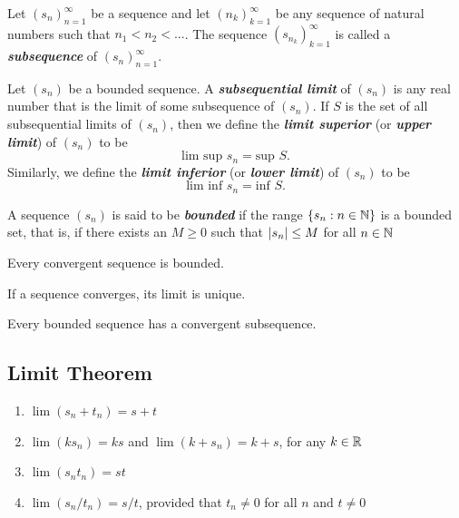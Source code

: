 \documentclass[12pt]{article}
\begin{document}
\begin{definition}[Subsequence]
Let $(s_n)_{n=1}^\infty$ be a sequence and let $(n_k)_{k=1}^{\infty}$ be any sequence
of natural numbers such that $n_1 < n_2 < ...$. The sequence
$(s_{n_k})_{k=1}^{\infty}$ is called a \textit{\textbf{subsequence}} of
$(s_n)_{n=1}^\infty$.
\end{definition}

\begin{definition}
  Let $(s_n)$ be a bounded sequence. A \textbf{\textit{subsequential limit}}
  of $(s_n)$ is any real number that is the limit of some subsequence of
  $(s_n)$. If $S$ is the set of all subsequential limits of $(s_n)$, then we
  define the \textbf{\textit{limit superior}} (or \textbf{\textit{upper
  limit}}) of $(s_n)$ to be $$\text{lim sup } s_n = \text{sup } S.$$
  Similarly, we define the \textit{\textbf{limit inferior}} (or
  \textit{\textbf{lower limit}}) of $(s_n)$ to be $$\text{lim inf } s_n =
  \text{inf } S.$$
\end{definition}

\begin{definition}
  A sequence $(s_n)$ is said to be \textit{\textbf{bounded}} if the range $\{
  s_n : n \in \mathbb{N} \}$ is a bounded set, that is, if there exists an $M \ge
  0$ such that $\left|s_n\right| \le M$ for all $n \in \mathbb{N}$

  Every convergent sequence is bounded.

  If a sequence converges, its limit is unique.

  Every bounded sequence has a convergent subsequence.
\end{definition}

\subsection{Limit Theorem}
\label{sec:org6fa30c4}
\begin{definition}
  \begin{enumerate}
    \item $\lim{(s_n + t_n)} = s + t$
    \item $\lim{(ks_n)} = ks$ and $\lim{(k + s_n)} = k + s$, for any $k \in
      \mathbb{R}$
    \item $\lim{(s_n t_n)} = st$
    \item $\lim{(s_n/t_n)} = s/t$, provided that $t_n \ne 0$ for all $n$ and $t
      \ne 0$
  \end{enumerate}
\end{definition}
\end{document}
